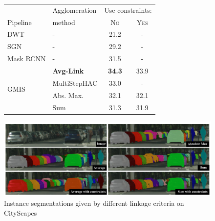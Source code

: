 \begin{figure}[t]
\centering
\begin{minipage}[b]{0.5\textwidth}
    \centering
    \scriptsize
        \begin{tabular}{l|l|cc}
           & Agglomeration  &  \multicolumn{2}{c}{Use constraints:} \\
          Pipeline & method & \textsc{No} & \textsc{Yes} \\ \midrule
DWT \cite{bai2017deep} & - & 21.2 & - \\
SGN \cite{liu2017sgn} & - & 29.2 & - \\
Mask RCNN \cite{he2017mask} & - & 31.5 & - \\ \hline
 & \textbf{\algname{} Avg-Link}& \textbf{34.3}  & 33.9  \\
\multirow{2}{*}{GMIS \cite{liu2018affinity}} & MultiStepHAC \cite{liu2018affinity} & 33.0 & -  \\
 & \algname{} Abs. Max. \cite{wolf2018mutex}  & 32.1 & 32.1 \\
 & \algname{} Sum \cite{keuper2015efficient,levinkov2017comparative} & 31.3  & 31.9  \\
        \end{tabular}
    \label{tab:results_cityscapes_val}
\end{minipage}\hfill
\begin{minipage}[b]{0.46\textwidth}
    \centering
\includegraphics[width=\textwidth]{./figs/cityscapes_compare_3.pdf} %
\caption{Instance segmentations given by different \algname{} linkage criteria on CityScapes}\label{fig:cityscapes}
\end{minipage}
\end{figure}
